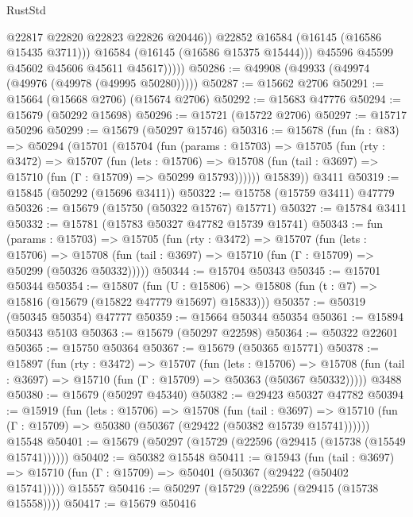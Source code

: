 \begin{lexlean}{RustStd}
\begin{coremodule}
                      @22817
                      @22820
                      @22823
                      @22826
                      @20446))
                  @22852
                  @16584
                  (@16145 (@16586 @15435 @3711)))
                @16584
                (@16145 (@16586 @15375 @15444)))
              @45596
              @45599
              @45602
              @45606
              @45611
              @45617)))))
@50286 := @49908 (@49933 (@49974 (@49976 (@49978 (@49995 @50280)))))
@50287 := @15662 @2706
@50291 := @15664 (@15668 @2706) (@15674 @2706)
@50292 := @15683 @47776
@50294 := @15679 (@50292 @15698)
@50296 := @15721 (@15722 @2706)
@50297 := @15717 @50296
@50299 := @15679 (@50297 @15746)
@50316 := @15678
    (fun (fn : @83) =>
    @50294
      (@15701
        (@15704
          (fun (params : @15703) =>
          @15705
            (fun (rty : @3472) =>
            @15707
              (fun (lets : @15706) =>
              @15708 (fun (tail : @3697) => @15710 (fun (Γ : @15709) => @50299 @15793))))))
        @15839))
    @3411
@50319 := @15845 (@50292 (@15696 @3411))
@50322 := @15758 (@15759 @3411) @47779
@50326 := @15679 (@15750 (@50322 @15767) @15771)
@50327 := @15784 @3411
@50332 := @15781 (@15783 @50327 @47782 @15739 @15741)
@50343 := fun (params : @15703) =>
  @15705
    (fun (rty : @3472) =>
    @15707
      (fun (lets : @15706) =>
      @15708 (fun (tail : @3697) => @15710 (fun (Γ : @15709) => @50299 (@50326 @50332)))))
@50344 := @15704 @50343
@50345 := @15701 @50344
@50354 := @15807
    (fun (U : @15806) => @15808 (fun (t : @7) => @15816 (@15679 (@15822 @47779 @15697) @15833)))
@50357 := @50319 (@50345 @50354) @47777
@50359 := @15664 @50344 @50354
@50361 := @15894 @50343 @5103
@50363 := @15679 (@50297 @22598)
@50364 := @50322 @22601
@50365 := @15750 @50364
@50367 := @15679 (@50365 @15771)
@50378 := @15897
    (fun (rty : @3472) =>
    @15707
      (fun (lets : @15706) =>
      @15708 (fun (tail : @3697) => @15710 (fun (Γ : @15709) => @50363 (@50367 @50332)))))
    @3488
@50380 := @15679 (@50297 @45340)
@50382 := @29423 @50327 @47782
@50394 := @15919
    (fun (lets : @15706) =>
    @15708
      (fun (tail : @3697) =>
      @15710 (fun (Γ : @15709) => @50380 (@50367 (@29422 (@50382 @15739 @15741))))))
    @15548
@50401 := @15679 (@50297 (@15729 (@22596 (@29415 (@15738 (@15549 @15741))))))
@50402 := @50382 @15548
@50411 := @15943
    (fun (tail : @3697) => @15710 (fun (Γ : @15709) => @50401 (@50367 (@29422 (@50402 @15741)))))
    @15557
@50416 := @50297 (@15729 (@22596 (@29415 (@15738 @15558))))
@50417 := @15679 @50416

\end{coremodule}
\end{lexlean}
